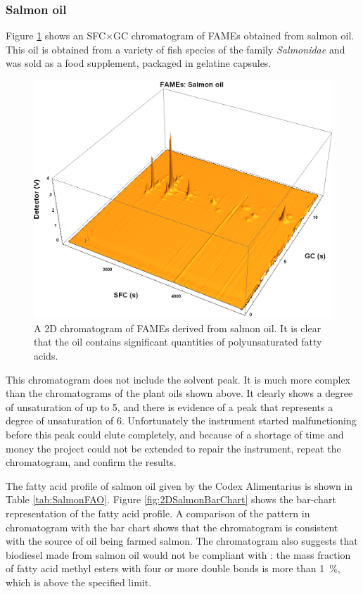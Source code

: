 \subsubsection{Salmon oil}
Figure \ref{fig:2DSalmon} shows an SFC×GC chromatogram of FAMEs obtained from
salmon oil. This oil is obtained from a variety of fish species of the family
\textit{Salmonidae} \autocite{JFAOWHOCAC2017} and was sold as a food
supplement, packaged in gelatine capsules.

\begin{figure}
\centering
\includegraphics[width=\textwidth]{Figures/Salmon.png}
\decoRule

\caption[SFC×GC of salmon oil]{A 2D chromatogram of FAMEs derived from salmon
oil. It is clear that the oil contains significant quantities of polyunsaturated
fatty acids.}

\label{fig:2DSalmon}
\end{figure}

This chromatogram does not include the \oneD solvent peak. It is much more
complex than the chromatograms of the plant oils shown above. It clearly
shows a degree of unsaturation of up to 5, and there is evidence of a peak that
represents a degree of unsaturation of 6. Unfortunately the instrument started
malfunctioning before this peak could elute completely, and because of a
shortage of time and money the project could not be extended to repair the
instrument, repeat the chromatogram, and confirm the results. 

The fatty acid profile of salmon oil given by the Codex Alimentarius
\autocite{JFAOWHOCAC2017} is shown in Table \ref{tab:SalmonFAO}. Figure
\ref{fig:2DSalmonBarChart} shows the bar-chart representation of the fatty acid
profile. A comparison of the pattern in chromatogram with the bar chart shows
that the chromatogram is consistent with the source of oil being farmed salmon.
The chromatogram also suggests that biodiesel made from salmon oil would not be
compliant with : the mass fraction of fatty acid methyl esters
with four or more double bonds is more than \SI{1}{\percent}, which is above the
specified limit.

